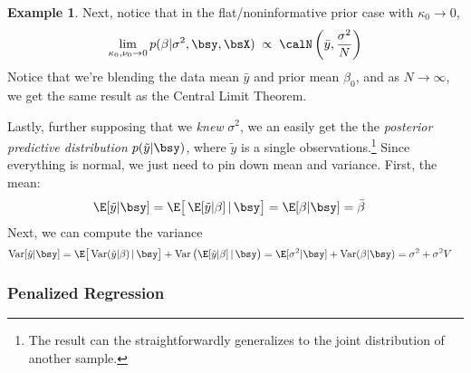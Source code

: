 \documentclass[12pt]{article}
\theoremstyle{plain}
\theoremstyle{definition}
\newtheorem{ex}[thm]{Example}
\theoremstyle{remark}
\newcommand{\ra}{\rightarrow}
\newcommand{\Var}{\operatorname{Var}}
\newcommand{\sumnN}{\sum^N_{n=1}}
\begin{document}
\begin{ex}
Next, notice that in the flat/noninformative prior case with
$\kappa_0\ra 0$,
\begin{align*}
  \lim_{\kappa_0,\nu_0\ra 0}
  p(\beta|\sigma^2,\bsy,\bsX)
  \;\propto\;
  \calN\left(\bar{y},\frac{\sigma^2}{N}\right)
\end{align*}
Notice that we're blending the data mean $\bar{y}$ and prior
mean $\beta_0$, and as $N\rightarrow \infty$, we get the same
result as the Central Limit Theorem.

Lastly, further supposing that we \emph{knew} $\sigma^2$, we an easily
get the the \emph{posterior predictive distribution}
$p(\tilde{y}|\bsy)$, where $\tilde{y}$ is a single
observations.\footnote{
  The result can the straightforwardly generalizes to the joint
  distribution of another sample.
}
Since everything is normal, we just need to pin down mean and variance.
First, the mean:
\begin{align*}
  \E[\tilde{y} | \bsy ]
  &= \E\big[\, \E[\tilde{y}|\beta] \,|\, \bsy \big]
  = \E[\beta|\bsy]
  = \bar{\beta}
\end{align*}
Next, we can compute the variance
\begin{align*}
	 \Var[\tilde{y} | \bsy ]
   &=
    \E\big[ \Var(\tilde{y} | \beta) \,|\,  \bsy \big]
	    + \Var\big( \E[\tilde{y} | \beta] \,|\, \bsy \big)
	 = \E[ \sigma^2 | \bsy ] + \Var( \beta | \bsy)
	 = \sigma^2 + \sigma^2 V
\end{align*}
\end{ex}






\clearpage
\subsubsection{Penalized Regression}
\end{document}
